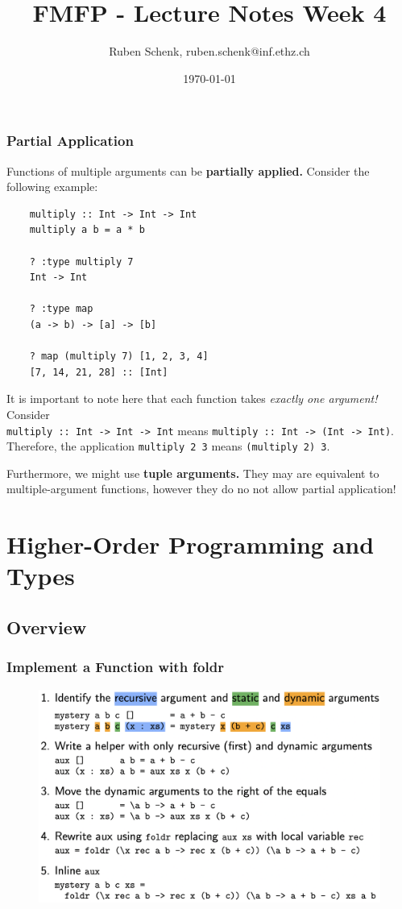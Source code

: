 \documentclass[a4paper]{extarticle}
\title{FMFP - Lecture Notes Week 4}
\author{Ruben Schenk, ruben.schenk@inf.ethz.ch}
\date{\today}
\begin{document}
\maketitle
\newpage

\subsubsection{Partial Application}

Functions of multiple arguments can be \textbf{partially applied.} Consider the following example:

\begin{verbatim}
    multiply :: Int -> Int -> Int
    multiply a b = a * b

    ? :type multiply 7
    Int -> Int

    ? :type map
    (a -> b) -> [a] -> [b]

    ? map (multiply 7) [1, 2, 3, 4]
    [7, 14, 21, 28] :: [Int]
\end{verbatim}

It is important to note here that each function takes \textit{exactly one argument!} Consider\\ \verb|multiply :: Int -> Int -> Int| means \verb|multiply :: Int -> (Int -> Int)|. Therefore, the application \verb|multiply 2 3| means \verb|(multiply 2) 3|.

Furthermore, we might use \textbf{tuple arguments.} They may are equivalent to multiple-argument functions, however they do no not allow partial application!

\section{Higher-Order Programming and Types}

\subsection{Overview}

\subsubsection{Implement a Function with foldr}

\begin{figure}[H]
    \includegraphics[width=13cm]{../images/FMFP_Fig4-1}
    \centering
\end{figure}
\end{document}
